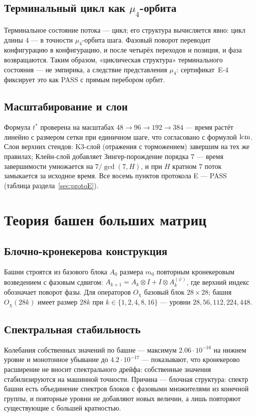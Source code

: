 \subsection{Терминальный цикл как $\mu_4$-орбита}

Терминальное состояние потока --- цикл; его структура вычисляется
явно: цикл длины $4$ --- в точности $\mu_4$-орбита шага. Фазовый
поворот переводит конфигурацию в конфигурацию, и после четырёх
переходов и позиция, и фаза возвращаются. Таким образом,
«циклическая структура» терминального состояния --- не эмпирика,
а следствие представления $\mu_4$: сертификат~E-4 фиксирует это
как PASS с прямым перебором орбит.

\subsection{Масштабирование и слои}

Формула $t^*$ проверена на масштабах $48\to96\to192\to384$ ---
время растёт линейно с размером сетки при единичном шаге, что
согласовано с формулой $\operatorname{lcm}$. Слои верхних стендов:
K3-слой (отражения с торможением) завершим на тех же правилах;
Клейн-слой добавляет Зингер-порождение порядка $7$ --- время
завершимости умножается на $7/\gcd(7,H)$, и при $H$ кратном $7$
поток замыкается за исходное время. Все восемь пунктов протокола
E --- PASS (таблица раздела~\ref{sec:protoE}).

\section{Теория башен больших матриц}\label{sec:towers}

\subsection{Блочно-кронекерова конструкция}

Башни строятся из базового блока $A_0$ размера $m_0$ повторным
кронекеровым возведением с фазовым сдвигом:
$A_{k+1}=A_k\otimes I + I\otimes A_k^{(\varphi)}$, где верхний
индекс обозначает поворот фазы. Для операторов $O_\chi$ базовый
блок $28\times28$; башня $O_\chi(28k)$ имеет размер $28k$ при
$k\in\{1,2,4,8,16\}$ --- уровни $28,56,112,224,448$.

\subsection{Спектральная стабильность}

Колебания собственных значений по башне --- максимум
$2.06\cdot10^{-16}$ на нижнем уровне и монотонное убывание до
$4.2\cdot10^{-17}$ --- показывают, что кронекерово расширение не
вносит спектрального дрейфа: собственные значения стабилизируются
на машинной точности. Причина --- блочная структура: спектр башни
есть объединение спектров блоков с фазовыми множителями из
конечной группы, и повторные уровни не добавляют новых величин, а
лишь повторяют существующие с большей кратностью.


